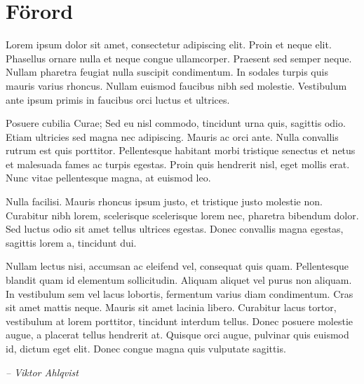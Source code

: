 \chapter{Förord}
Lorem ipsum dolor sit amet, consectetur adipiscing elit. Proin et neque elit. Phasellus ornare nulla et neque congue ullamcorper. Praesent sed semper neque. Nullam pharetra feugiat nulla suscipit condimentum. In sodales turpis quis mauris varius rhoncus. Nullam euismod 
faucibus nibh sed molestie. Vestibulum ante ipsum primis in faucibus orci luctus et ultrices.

\begin{redovisning}
Posuere cubilia Curae; Sed eu nisl commodo, tincidunt urna quis, sagittis odio. Etiam ultricies sed magna nec adipiscing. Mauris ac orci ante. Nulla convallis rutrum est quis porttitor. Pellentesque habitant morbi tristique senectus et netus et malesuada fames ac turpis egestas. Proin quis hendrerit nisl, eget mollis erat. Nunc vitae pellentesque magna, at euismod leo.
\end{redovisning}

\begin{bokslut}
Nulla facilisi. Mauris rhoncus ipsum justo, et tristique justo molestie non. Curabitur nibh lorem, scelerisque scelerisque lorem nec, pharetra bibendum dolor. Sed luctus odio sit amet tellus ultrices egestas. Donec convallis magna egestas, sagittis lorem a, tincidunt dui. 
\end{bokslut}

Nullam lectus nisi, accumsan ac eleifend vel, consequat quis quam. Pellentesque blandit quam id elementum sollicitudin. Aliquam aliquet vel purus non aliquam. In vestibulum sem vel lacus lobortis, fermentum varius diam condimentum. Cras sit amet mattis neque. Mauris sit amet lacinia libero. Curabitur lacus tortor, vestibulum at lorem porttitor, tincidunt interdum tellus. Donec posuere molestie augue, a placerat tellus hendrerit at. Quisque orci augue, pulvinar quis euismod id, dictum eget elit. Donec congue magna quis vulputate sagittis.

\emph{-- Viktor Ahlqvist}